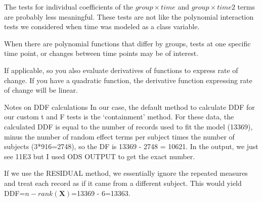 \documentclass[
  9pt,
  ignorenonframetext,
]{beamer}
\begin{document}
\begin{frame}{}
\protect\hypertarget{section-14}{}
The tests for individual coefficients of the \(group \times time\) and
\(group \times time2\) terms are probably less meaningful. These tests
are not like the polynomial interaction tests we considered when time
was modeled as a class variable.

When there are polynomial functions that differ by groups, tests at one
specific time point, or changes between time points may be of interest.

If applicable, so you also evaluate derivatives of functions to express
rate of change. If you have a quadratic function, the derivative
function expressing rate of change will be linear.

\begin{block}{Notes on DDF calculations}
\protect\hypertarget{notes-on-ddf-calculations}{}
In our case, the default method to calculate DDF for our custom t and F
tests is the `containment' method. For these data, the calculated DDF is
equal to the number of records used to fit the model (13369), minus the
number of random effect terms per subject times the number of subjects
(3*916=2748), so the DF is 13369 - 2748 = 10621. In the output, we just
see 11E3 but I used ODS OUTPUT to get the exact number.

If we use the RESIDUAL method, we essentially ignore the repeated
measures and treat each record as if it came from a different subject.
This would yield DDF=\(n-rank(\pmb X)\)=13369 - 6=13363.
\end{block}
\end{frame}
\end{document}
